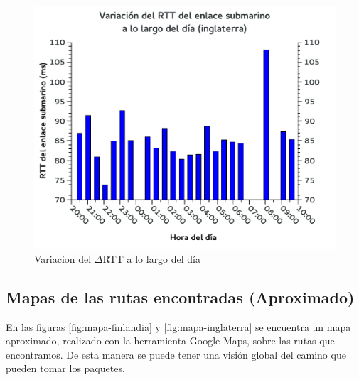 \begin{figure}[H]
  \begin{center}
    \includegraphics[scale=0.8]{graficos/inglaterra-drtt-enlace-dia.pdf}
	\caption{Variacion del  $\Delta$RTT a lo largo del día}
    \label{fig:inglaterra-drtt-enlace-dia}  
  \end{center}
\end{figure}

\subsection{Mapas de las rutas encontradas (Aproximado)}

En las figuras \ref{fig:mapa-finlandia} y \ref{fig:mapa-inglaterra} se encuentra un mapa aproximado, realizado con la herramienta Google Maps, sobre las rutas que encontramos. De esta manera se puede tener una visión global del camino que pueden tomar los paquetes.

